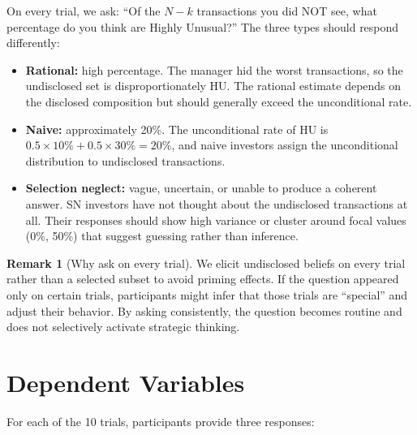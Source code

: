 \documentclass[12pt]{article}
\theoremstyle{definition}
\newtheorem{remark}{Remark}
\begin{document}
On every trial, we ask: ``Of the $N - k$ transactions you did NOT see, what percentage do you think are Highly Unusual?'' The three types should respond differently:
\begin{itemize}[nosep]
\item \textbf{Rational:} high percentage. The manager hid the worst transactions, so the undisclosed set is disproportionately HU. The rational estimate depends on the disclosed composition but should generally exceed the unconditional rate.
\item \textbf{Naive:} approximately 20\%. The unconditional rate of HU is $0.5 \times 10\% + 0.5 \times 30\% = 20\%$, and naive investors assign the unconditional distribution to undisclosed transactions.
\item \textbf{Selection neglect:} vague, uncertain, or unable to produce a coherent answer. SN investors have not thought about the undisclosed transactions at all. Their responses should show high variance or cluster around focal values (0\%, 50\%) that suggest guessing rather than inference.
\end{itemize}

\begin{remark}[Why ask on every trial]
We elicit undisclosed beliefs on every trial rather than a selected subset to avoid priming effects. If the question appeared only on certain trials, participants might infer that those trials are ``special'' and adjust their behavior. By asking consistently, the question becomes routine and does not selectively activate strategic thinking.
\end{remark}


\section{Dependent Variables}
\label{sec:dvs}

For each of the 10 trials, participants provide three responses:
\end{document}
